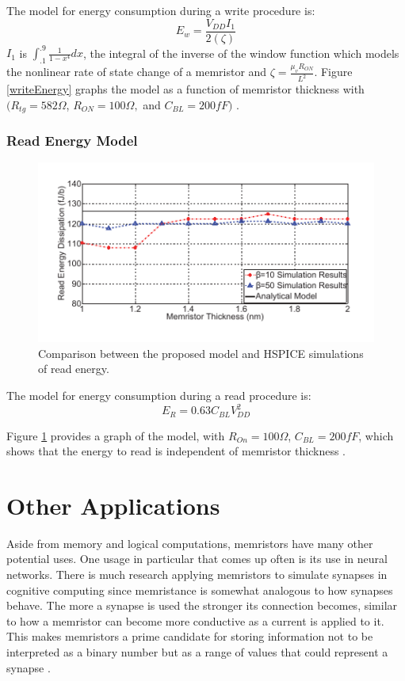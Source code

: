 \documentclass{sig-alternate}
\begin{document}
The model for energy consumption during a write procedure is:
\begin{equation*}
E_{w} = \frac{V_{DD}I_{1}}{2(\zeta)}
\end{equation*}
$I_{1}$ is $\int_{.1}^{.9} \frac{1}{1-x^4} dx$, the integral of the inverse of the window function which models the nonlinear rate of state change of a memristor and $\zeta = \frac{\mu _{v}R_{ON}}{L^2}$.  Figure \ref{writeEnergy} graphs the model as a function of memristor thickness with $(R_{tg} = 582 \Omega$, $R_{ON} = 100 \Omega ,$ and $C_{BL} = 200fF)$ \cite{Zangeneh:2012:PEM:2206781.2206786}.

\subsubsection{Read Energy Model} 
\begin{figure}
  \includegraphics[scale=1.2]{readenergy.pdf}
  \caption{Comparison between the proposed model and HSPICE simulations of read energy.}
  \label{fig:readEnergy}
\end{figure}
The model for energy consumption during a read procedure is:
\begin{equation*}
E_{R} = 0.63C_{BL}V^2_{DD}
\end{equation*}

Figure \ref{fig:readEnergy} provides a graph of the model, with $R_{On} = 100 \Omega $, $C_{BL} = 200fF$, which shows that the energy to read is independent of memristor thickness \cite{Zangeneh:2012:PEM:2206781.2206786}.

\section{Other Applications}
Aside from memory and logical computations, memristors have many other potential uses.  One usage in particular that comes up often is its use in neural networks.  There is much research applying memristors to simulate synapses in cognitive computing since memristance is somewhat analogous to how synapses behave.  The more a synapse is used the stronger its connection becomes, similar to how a memristor can become more conductive as a current is applied to it.  This makes memristors a prime candidate for storing information not to be interpreted as a binary number but as a range of values that could represent a synapse \cite{5713299}.
\end{document}
